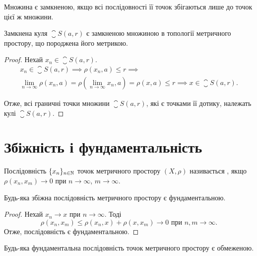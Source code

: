 \begin{corollary}
Множина є замкненою, якщо всі
послідовності її точок збігаються лише до точок цієї ж
множини.
\end{corollary}

\begin{theorem}
Замкнена куля $\closure S(a, r)$ є замкненою
множиною в топології метричного простору, що
породжена його метрикою.
\end{theorem}

\begin{proof}
Нехай $x_n \in \closure S(a, r)$.
\begin{multline*}
    x_n \in \closure S(a, r) \implies
    \rho(x_n, a) \le r \implies \\
    \lim_{n \to \infty} \rho(x_n, a) = \rho\left(\lim_{n \to \infty} x_n, a\right) = \rho(x, a) \le r \implies
    x \in \closure S(a, r).
\end{multline*}

Отже, всі граничні точки множини $\closure S(a, r)$, які є точками
її дотику, належать кулі $\closure S(a, r)$. 
\end{proof}

\section{Збіжність і фундаментальність}

\begin{definition}
Послідовність $\{x_n\}_{n \in \mathbb{N}}$ точок метричного
простору $(X, \rho)$ називається , якщо
$\rho(x_n, x_m) \to 0$ при $n \to \infty$, $m \to \infty$.
\end{definition}

\begin{lemma}
Будь-яка збіжна послідовність метричного
простору є фундаментальною.
\end{lemma}

\begin{proof}
Нехай $x_n \to x$ при $n \to \infty$. Тоді
\begin{equation*}
    \rho(x_n, x_m) \le \rho(x_n, x) + \rho(x, x_m) \to 0 \text{ при } n, m \to \infty.
\end{equation*}
Отже, послідовність є фундаментальною. 
\end{proof}

\begin{lemma}
Будь-яка фундаментальна послідовність
точок метричного простору є обмеженою.
\end{lemma}

